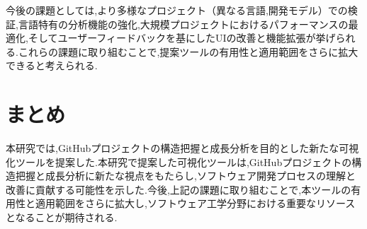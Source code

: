 \documentclass[12pt,twoside]{jbook}
\begin{document}
今後の課題としては,より多様なプロジェクト（異なる言語,開発モデル）での検証,言語特有の分析機能の強化,大規模プロジェクトにおけるパフォーマンスの最適化,そしてユーザーフィードバックを基にしたUIの改善と機能拡張が挙げられる.これらの課題に取り組むことで,提案ツールの有用性と適用範囲をさらに拡大できると考えられる.
\chapter{まとめ}
本研究では,GitHubプロジェクトの構造把握と成長分析を目的とした新たな可視化ツールを提案した.本研究で提案した可視化ツールは,GitHubプロジェクトの構造把握と成長分析に新たな視点をもたらし,ソフトウェア開発プロセスの理解と改善に貢献する可能性を示した.今後,上記の課題に取り組むことで,本ツールの有用性と適用範囲をさらに拡大し,ソフトウェア工学分野における重要なリソースとなることが期待される.



%
%




\appendix
\end{document}
